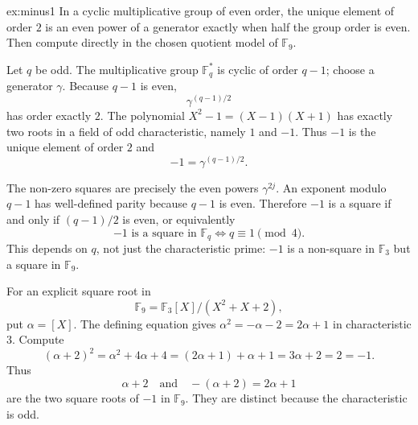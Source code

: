 \begin{solution}{ex:minus1}
\idea In a cyclic multiplicative group of even order, the unique element of order $2$ is an even power of a generator exactly when half the group order is even. Then compute directly in the chosen quotient model of $\mathbb F_9$.

\writeup Let $q$ be odd. The multiplicative group $\mathbb F_q^*$ is cyclic of order $q-1$; choose a generator $\gamma$. Because $q-1$ is even,
\[
\gamma^{(q-1)/2}
\]
has order exactly $2$. The polynomial $X^2-1=(X-1)(X+1)$ has exactly two roots in a field of odd characteristic, namely $1$ and $-1$. Thus $-1$ is the unique element of order $2$ and
\[
-1=\gamma^{(q-1)/2}.
\]

The non-zero squares are precisely the even powers $\gamma^{2j}$. An exponent modulo $q-1$ has well-defined parity because $q-1$ is even. Therefore $-1$ is a square if and only if $(q-1)/2$ is even, or equivalently
\[
\boxed{-1\text{ is a square in }\mathbb F_q\iff q\equiv1\pmod4}.
\]
This depends on $q$, not just the characteristic prime: $-1$ is a non-square in $\mathbb F_3$ but a square in $\mathbb F_9$.

For an explicit square root in
\[
\mathbb F_9=\mathbb F_3[X]/(X^2+X+2),
\]
put $\alpha=[X]$. The defining equation gives $\alpha^2=-\alpha-2=2\alpha+1$ in characteristic $3$. Compute
\[
(\alpha+2)^2=\alpha^2+4\alpha+4
=(2\alpha+1)+\alpha+1
=3\alpha+2=2=-1.
\]
Thus
\[
\boxed{\alpha+2\quad\text{and}\quad-(\alpha+2)=2\alpha+1}
\]
are the two square roots of $-1$ in $\mathbb F_9$. They are distinct because the characteristic is odd.
\end{solution}

